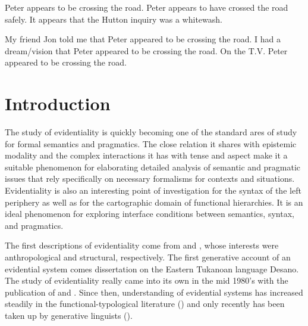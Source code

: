 \documentclass{article}
\begin{document}
\begin{exe}
\ex \label{peter}
\begin{xlist}
\ex Peter appears to be crossing the road.
\ex Peter appears to have crossed the road safely.
\ex It appears that the Hutton inquiry was a whitewash.
\end{xlist}
\ex \label{peterreadings}
\begin{xlist}
\end{xlist}
\ex \label{appeared}
\begin{xlist}
\ex My friend Jon told me that Peter appeared to be crossing the road.
\ex I had a dream/vision that Peter appeared to be crossing the road.
\ex On the T.V. Peter appeared to be crossing the road.
\end{xlist}
\end{exe}
 

\section{Introduction}
The study of evidentiality is quickly becoming one of the standard ares of study for formal semantics and pragmatics. The close relation it shares with epistemic modality and the complex interactions it has with tense and aspect make it a suitable phenomenon for elaborating detailed analysis of semantic and pragmatic issues that rely specifically on necessary formalisms for contexts and situations. Evidentiality is also an interesting point of investigation for the syntax of the left periphery as well as for the cartographic domain of functional hierarchies. It is an ideal phenomenon for exploring interface conditions between semantics, syntax, and pragmatics.   
  
The first descriptions of evidentiality come from \cite{boas11handbook} and \cite{jakobson57shifters}, whose interests were anthropological and structural, respectively. The first generative account of an evidential system comes  dissertation on the Eastern Tukanoan language Desano. The study of evidentiality really came into its own in the mid 1980's with the publication of \cite{chafenichols86evd} and \cite{willett88evd}. Since then, understanding of evidential systems has increased steadily in the functional-typological literature (\citealt{aikhenvald04evd}) and only recently has been taken up by generative linguists (\citealt{rooryck01evd}).
\end{document}
